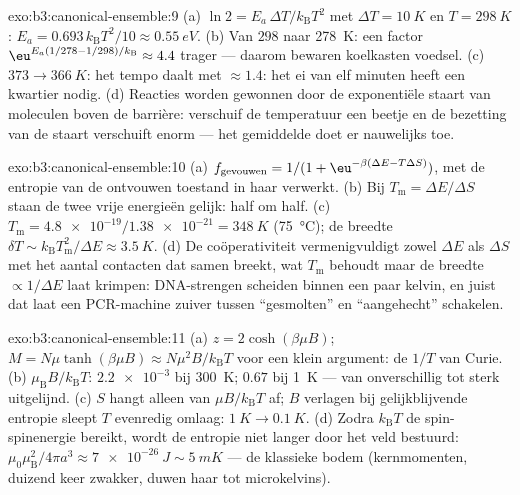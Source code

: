 \begin{solution}{exo:b3:canonical-ensemble:9}
(a) $\ln2 = E_a\,\Delta T/k_{\text{B}}T^2$ met $\Delta T =
\qty{10}{K}$ en $T = \qty{298}{K}$: $E_a =
0.693\,k_{\text{B}}T^2/10 \approx \qty{0.55}{eV}$. (b) Van
$298$ naar \qty{278}{K}: een factor $\eu^{E_a(1/278 - 1/298)/k_{\text{B}}}
\approx 4.4$ trager --- daarom bewaren koelkasten
voedsel. (c) $373 \to \qty{366}{K}$: het tempo daalt met $\approx1.4$:
het ei van elf minuten heeft een kwartier nodig. (d) Reacties worden
gewonnen door de exponentiële staart van moleculen boven de barrière:
verschuif de temperatuur een beetje en de bezetting van de staart
verschuift enorm --- het gemiddelde doet er nauwelijks toe.
\end{solution}

\begin{solution}{exo:b3:canonical-ensemble:10}
(a) $f_{\text{gevouwen}} = 1/(1 + \eu^{-\beta(\Delta E -
T\Delta S)})$, met de entropie van de ontvouwen toestand in haar  verwerkt. (b) Bij $T_{\text{m}} = \Delta E/\Delta S$ staan de twee
vrije energieën gelijk: half om half. (c) $T_{\text{m}} =
\num{4.8e-19}/\num{1.38e-21} = \qty{348}{K}$ (\qty{75}{\celsius}); de
breedte $\delta T \sim k_{\text{B}}T_{\text{m}}^2/\Delta E \approx
\qty{3.5}{K}$. (d) De coöperativiteit vermenigvuldigt zowel $\Delta E$ als
$\Delta S$ met het aantal contacten dat samen breekt, wat $T_{\text{m}}$
behoudt maar de breedte $\propto 1/\Delta E$ laat krimpen: DNA-strengen
scheiden binnen een paar kelvin, en juist dat laat een PCR-machine zuiver
tussen ``gesmolten'' en ``aangehecht'' schakelen.
\end{solution}

\begin{solution}{exo:b3:canonical-ensemble:11}
(a) $z = 2\cosh(\beta\mu B)$; $M = N\mu\tanh(\beta\mu B) \approx
N\mu^2B/k_{\text{B}}T$ voor een klein argument: de $1/T$ van Curie. (b)
$\mu_{\text{B}}B/k_{\text{B}}T$: $\num{2.2e-3}$ bij \qty{300}{K};
$0.67$ bij \qty{1}{K} --- van onverschillig tot sterk uitgelijnd. (c)
$S$ hangt alleen van $\mu B/k_{\text{B}}T$ af; $B$ verlagen bij
gelijkblijvende entropie sleept $T$ evenredig omlaag: $\qty{1}{K} \to
\qty{0.1}{K}$. (d) Zodra $k_{\text{B}}T$ de spin-spinenergie bereikt,
wordt de entropie niet langer door het veld bestuurd:
$\mu_0\mu_{\text{B}}^2/4\pi a^3 \approx \qty{7e-26}{J} \sim
\qty{5}{mK}$ --- de klassieke bodem (kernmomenten, duizend keer zwakker,
duwen haar tot microkelvins).
\end{solution}

